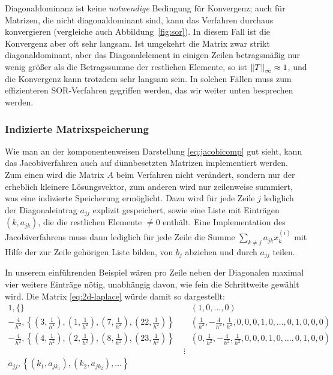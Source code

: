 Diagonaldominanz ist keine
\emph{notwendige} Bedingung für Konvergenz;
auch für Matrizen, die nicht diagonaldominant
sind, kann das Verfahren durchaus konvergieren
(vergleiche auch Abbildung~\ref{fig:sor}). In diesem Fall ist die
Konvergenz aber oft sehr langsam. Ist umgekehrt die Matrix zwar strikt
diagonaldominant, aber das Diagonalelement in einigen Zeilen betragsmäßig
nur wenig größer als die Betragssumme der restlichen Elemente, so ist $\left\lVert{T}\right\rVert_\infty\approx 1$, und die Konvergenz kann trotzdem sehr langsam sein. In solchen Fällen muss
zum effizienteren SOR-Verfahren gegriffen werden, das wir weiter unten besprechen
werden.

\subsubsection{Indizierte Matrixspeicherung}

Wie man an der komponentenweisen Darstellung \eqref{eq:jacobicomp} gut
sieht, kann das Jacobiverfahren auch auf dünnbesetzten Matrizen
implementiert werden. Zum einen wird die Matrix $A$ beim Verfahren
nicht verändert, sondern nur der erheblich kleinere Lösungsvektor, zum
anderen wird nur zeilenweise summiert, was eine indizierte Speicherung
ermöglicht.  Dazu wird für jede Zeile $j$ lediglich der
Diagonaleintrag $a_{jj}$ explizit gespeichert, sowie eine Liste mit
Einträgen $(k, a_{jk})$, die die restlichen Elemente $\neq 0$
enthält. Eine Implementation des Jacobiverfahrens muss dann lediglich
für jede Zeile die Summe $\sum_{k\neq j} a_{jk}x_k^{(i)}$ mit
Hilfe der zur Zeile gehörigen Liste bilden, von $b_j$ abziehen und
durch $a_{jj}$ teilen.

In unserem einführenden Beispiel wären pro Zeile neben der Diagonalen
maximal vier weitere Einträge nötig, unabhängig davon, wie fein die
Schrittweite gewählt wird. Die Matrix \eqref{eq:2d-laplace} würde
damit so dargestellt:
{\small
  \begin{align}
    1, \{\} \;&\mathop{\widehat{=}}\; \left(1, 0, \ldots, 0\right)
    \nonumber\\
    -\frac{4}{h^2}, \left\{
      \left(3, \frac{1}{h^2}\right), \left(1, \frac{1}{h^2}\right),
      \left(7, \frac{1}{h^2}\right), \left(22, \frac{1}{h^2}\right)
    \right\}
    \;&\mathop{\widehat{=}}\;
    \left(\frac{1}{h^2}, -\frac{4}{h^2}, \frac{1}{h^2}, 0, 0, 0, 1, 0,
      \ldots, 0, 1, 0, 0, 0\right)\nonumber\\
    -\frac{4}{h^2}, \left\{
      \left(4, \frac{1}{h^2}\right), \left(2, \frac{1}{h^2}\right),
      \left(8, \frac{1}{h^2}\right), \left(23, \frac{1}{h^2}\right)
    \right\}
    \;&\mathop{\widehat{=}}\;
    \left(0, \frac{1}{h^2}, -\frac{4}{h^2}, \frac{1}{h^2}, 0, 0, 0, 1, 0,
      \ldots, 0, 1, 0, 0\right)\nonumber\\
    &\vdots\\
    a_{jj}, \left\{(k_1, a_{jk_1}),(k_2, a_{jk_2}), \ldots\right\}
    \;&
  \end{align}}

